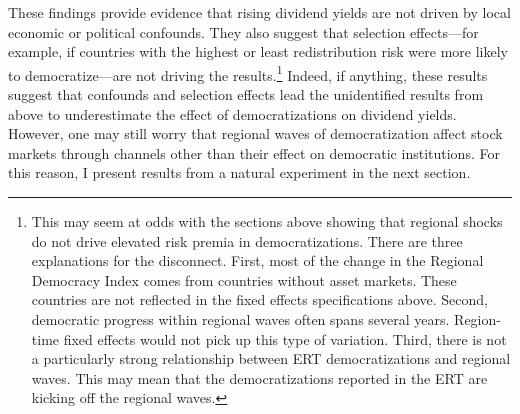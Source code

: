 These findings provide evidence that rising dividend yields are not driven by local economic or political confounds. They also suggest that selection effects---for example, if countries with the highest or least redistribution risk were more likely to democratize---are not driving the results.\footnote{This may seem at odds with the sections above showing that regional shocks do not drive elevated risk premia in democratizations. There are three explanations for the disconnect. First, most of the change in the Regional Democracy Index comes from countries without asset markets. These countries are not reflected in the fixed effects specifications above. Second, democratic progress within regional waves often spans several years. Region-time fixed effects would not pick up this type of variation. Third, there is not a particularly strong relationship between ERT democratizations and regional waves. This may mean that the democratizations reported in the ERT are kicking off the regional waves.} Indeed, if anything, these results suggest that confounds and selection effects lead the unidentified results from above to underestimate the effect of democratizations on dividend yields. However, one may still worry that regional waves of democratization affect stock markets through channels other than their effect on democratic institutions. For this reason, I present results from a natural experiment in the next section.


